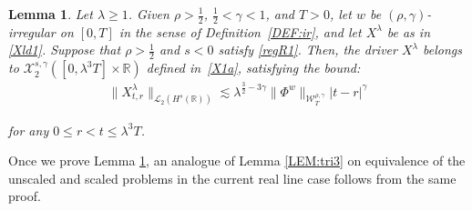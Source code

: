 \documentclass[letterpaper, 11pt,  reqno]{amsart}
\newtheorem{lemma}[theorem]{Lemma}
\newcommand{\1}{\hspace{0.5mm}\text{I}\hspace{0.5mm}}
\newcommand{\noi}{\noindent}
\newcommand{\R}{\mathbb{R}}
\newcommand{\g}{\gamma}
\newcommand{\ld}{\lambda}
\newcommand{\les}{\lesssim}
\newcommand{\cL}{\mathcal{L}}
\newcommand{\cX}{\mathcal{X}}
\newcommand{\W}{\mathcal{W}}
\numberwithin{equation}{section}
\numberwithin{theorem}{section}
\begin{document}
\begin{lemma}
\label{LEM:Rtri2}
Let $\ld \ge 1$.
Given $\rho > \frac 12$, $\frac 12 < \g < 1$, and $T> 0$, 
let  $w$ be $(\rho,\g)$-irregular on $[0, T]$ in the sense of Definition~\ref{DEF:ir}, 
and let $X^\ld$ be as in \eqref{Xld1}.
Suppose that $\rho > \frac 12$ and $s <  0$
satisfy 
\eqref{regR1}.
Then, 
the driver $X^\ld$ 
belongs to $  \cX^{s, \g}_2([0, \ld^3T] \times \R)$ defined in~\eqref{X1a}, 
satisfying the bound\textup{:}
 \begin{align*}
 \| X^{\ld}_{t,r}  \|_{\cL_2 ( H^s(\R)) }
 \les
 \ld^{ \frac32 -3\g} 
  \|\Phi^{w}\|_{\W_{T}^{\rho, \g}}
 |t-r|^{\g}
\end{align*}


\noi
for any $0\leq r<t \leq \ld^3T $.

\end{lemma}


Once we prove Lemma \ref{LEM:Rtri2}, 
an analogue of Lemma \ref{LEM:tri3} 
on  equivalence of the 
unscaled and scaled problems in the current real line case follows
from the same proof.
\end{document}
